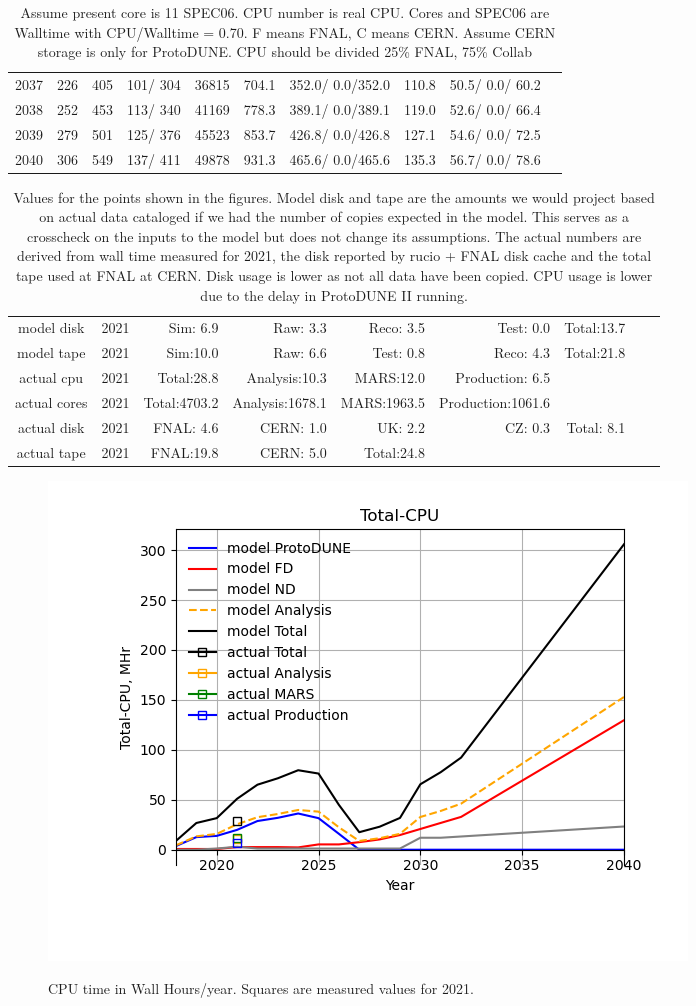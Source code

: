 \documentclass[12pt]{article}
\begin{document}
\begin{table}
\begin{tabular}[h]{crrrrrcccc}
2037&	 226&	 405&	 101/ 304&	 36815&	    704.1&	 352.0/  0.0/352.0&	    110.8&	  50.5/  0.0/ 60.2\\
2038&	 252&	 453&	 113/ 340&	 41169&	    778.3&	 389.1/  0.0/389.1&	    119.0&	  52.6/  0.0/ 66.4\\
2039&	 279&	 501&	 125/ 376&	 45523&	    853.7&	 426.8/  0.0/426.8&	    127.1&	  54.6/  0.0/ 72.5\\
2040&	 306&	 549&	 137/ 411&	 49878&	    931.3&	 465.6/  0.0/465.6&	    135.3&	  56.7/  0.0/ 78.6\\
\end{tabular}
\caption{Assume present core is   11 SPEC06. CPU number is real CPU. Cores and SPEC06 are Walltime with CPU/Walltime =  0.70.  F means FNAL, C means CERN. Assume CERN storage is only  for ProtoDUNE. CPU should be divided 25\% FNAL, 75\% Collab}\normalsize
 \end{table}
\begin{table}
\footnotesize
 \centering \begin{tabular}[h]{crrrrrrrr}
          model disk&2021&Sim: 6.9&Raw: 3.3&Reco: 3.5&Test: 0.0&Total:13.7\\
          model tape&2021&Sim:10.0&Raw: 6.6&Test: 0.8&Reco: 4.3&Total:21.8\\
          actual cpu&2021&Total:28.8&Analysis:10.3&MARS:12.0&Production: 6.5\\
        actual cores&2021&Total:4703.2&Analysis:1678.1&MARS:1963.5&Production:1061.6\\
         actual disk&2021&FNAL: 4.6&CERN: 1.0&UK: 2.2&CZ: 0.3&Total: 8.1\\
         actual tape&2021&FNAL:19.8&CERN: 5.0&Total:24.8\\
\end{tabular}
\caption{Values for the points shown in the figures. Model disk and tape are the amounts we would project based on actual data cataloged if we had the number of copies expected in the model. This serves as a crosscheck on the inputs to the model but does not change its assumptions.  The actual numbers are derived from wall time measured for 2021, the disk reported by rucio + FNAL disk cache and the total tape used at FNAL at CERN. Disk usage is lower as not all data have been copied. CPU usage is lower due to the delay in ProtoDUNE II running.}\normalsize
 \end{table}
\pagebreak\begin{figure}[h]
\centering\includegraphics[height=0.4\textwidth]{Parameters_2022-03-04-2040-Total-CPU.png}\label{TotalCPU}
\caption{CPU time in Wall Hours/year. Squares are measured values for 2021.}
\end{figure}
\end{document}
